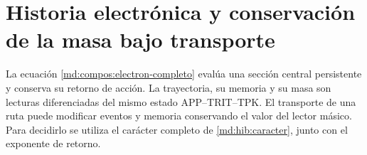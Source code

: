\section{Historia electrónica y conservación de la masa bajo transporte}
\label{md:r27:electron}

La ecuación \eqref{md:compos:electron-completo} evalúa una sección central
persistente y conserva su retorno de acción. La trayectoria, su memoria y
su masa son lecturas diferenciadas del mismo estado APP--TRIT--TPK. El
transporte de una ruta puede modificar eventos y memoria conservando el valor
del lector másico. Para decidirlo se utiliza el carácter completo de
\eqref{md:hib:caracter}, junto con el exponente de retorno.

